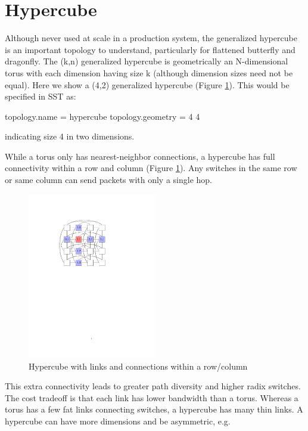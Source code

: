 \section{Hypercube}
\label{subsec:tutorial:hypercube}

Although never used at scale in a production system, the generalized hypercube is an important topology to understand, particularly for flattened butterfly and dragonfly.
The (k,n) generalized hypercube is geometrically an N-dimensional torus with each dimension having size k (although dimension sizes need not be equal).
Here we show a (4,2) generalized hypercube (Figure \ref{fig:topologies:hypercubeConnected}).  This would be specified in SST as:

\begin{ViFile}
topology.name = hypercube
topology.geometry = 4 4 
\end{ViFile}
indicating size 4 in two dimensions. 

While a torus only has nearest-neighbor connections, a hypercube has full connectivity within a row and column (Figure \ref{fig:topologies:hypercubeConnected}).
Any switches in the same row or same column can send packets with only a single hop.

\begin{figure}[h!]
\centering
\includegraphics[width=0.5\textwidth]{figures/tikz/hypercube/hypercube_connected.pdf}
\caption{Hypercube with links and connections within a row/column}
\label{fig:topologies:hypercubeConnected}
\end{figure}

This extra connectivity leads to greater path diversity and higher radix switches.
The cost tradeoff is that each link has lower bandwidth than a torus. 
Whereas a torus has a few fat links connecting switches, a hypercube has many thin links.
A hypercube can have more dimensions and be asymmetric, e.g.

